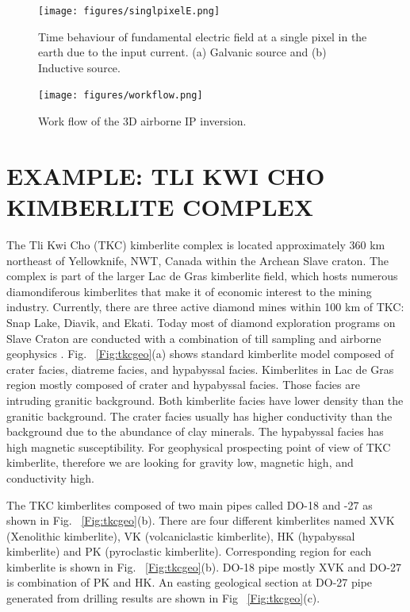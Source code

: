 \documentclass[letterpaper,11pt]{article}
\begin{document}
\begin{figure}[htb]
  \centering
  \texttt{[image: figures/singlpixelE.png]}
  \caption{Time behaviour of fundamental electric field at a single pixel in the earth due to the input current. (a) Galvanic source and (b) Inductive source. }
  \label{Fig:singlpixelE}
\end{figure}

\begin{figure}[htb]
  \centering
  \texttt{[image: figures/workflow.png]}
  \caption{Work flow of the 3D airborne IP inversion. }
  \label{Fig:workflow}
\end{figure}
\clearpage

\section{EXAMPLE: TLI KWI CHO KIMBERLITE COMPLEX}
The Tli Kwi Cho (TKC) kimberlite complex is located approximately 360 km northeast of Yellowknife, NWT, Canada within the Archean Slave craton. The complex is part of the larger Lac de Gras kimberlite field, which hosts numerous diamondiferous kimberlites that make it of economic interest to the mining industry. Currently, there are three active diamond mines within 100 km of TKC: Snap Lake, Diavik, and Ekati. Today most of diamond exploration programs on Slave Craton are conducted with a combination of till sampling and airborne geophysics \cite[]{Pell1997}. Fig. ~\ref{Fig:tkcgeo}(a) shows standard kimberlite model composed of crater facies, diatreme facies, and hypabyssal facies. Kimberlites in Lac de Gras region mostly composed of crater and hypabyssal facies. Those facies are intruding granitic background. Both kimberlite facies have lower density than the granitic background. The crater facies usually has higher conductivity than the background due to the abundance of clay minerals. The hypabyssal facies has high magnetic susceptibility. For geophysical prospecting point of view of TKC kimberlite, therefore we are looking for gravity low, magnetic high, and conductivity high. 

The TKC kimberlites composed of two main pipes called DO-18 and -27 as shown in  Fig. ~\ref{Fig:tkcgeo}(b). There are four different kimberlites named XVK (Xenolithic kimberlite), VK (volcaniclastic kimberlite), HK (hypabyssal kimberlite) and PK (pyroclastic kimberlite). Corresponding region for each kimberlite is shown in Fig. ~\ref{Fig:tkcgeo}(b). DO-18 pipe mostly XVK and DO-27 is combination of PK and HK. An easting geological section at DO-27 pipe generated from drilling results \cite[]{HarderEtAl2006} are shown in Fig ~\ref{Fig:tkcgeo}(c). 
\end{document}
